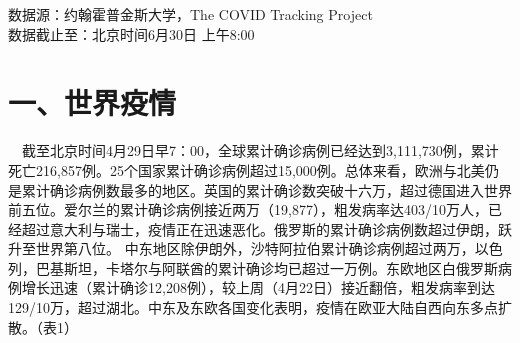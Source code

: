 \documentclass[
]{article}
\begin{document}
\vspace{5mm}

%
  \noindent{}%

\begin{Large}
{数据源：约翰霍普金斯大学，The COVID Tracking Project \\ 数据截止至：北京时间6月30日 上午8:00}
\end{Large}

\vspace{-7mm}

\hypertarget{section-2}{%
\section{\texorpdfstring{\textcolor{glaucous}{\Huge 一、世界疫情}}{}}\label{section-2}}

\vspace{-5mm}

\(\quad\)截至北京时间4月29日早7：00，全球累计确诊病例已经达到3,111,730例，累计死亡216,857例。25个国家累计确诊病例超过15,000例。总体来看，欧洲与北美仍是累计确诊病例数最多的地区。英国的累计确诊数突破十六万，超过德国进入世界前五位。爱尔兰的累计确诊病例接近两万（19,877），粗发病率达403/10万人，已经超过意大利与瑞士，疫情正在迅速恶化。俄罗斯的累计确诊病例数超过伊朗，跃升至世界第八位。
中东地区除伊朗外，沙特阿拉伯累计确诊病例超过两万，以色列，巴基斯坦，卡塔尔与阿联酋的累计确诊均已超过一万例。东欧地区白俄罗斯病例增长迅速（累计确诊12,208例），较上周（4月22日）接近翻倍，粗发病率到达129/10万，超过湖北。中东及东欧各国变化表明，疫情在欧亚大陆自西向东多点扩散。（表1）
\end{document}
